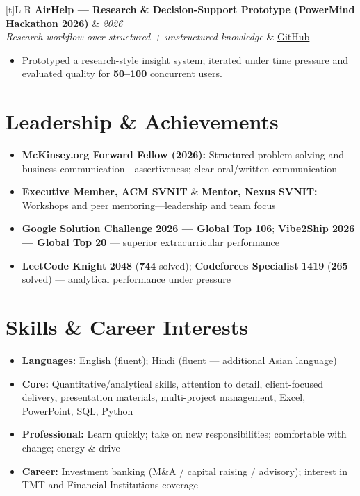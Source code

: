 \documentclass[a4paper,10pt]{article}
\newcommand{\resumeProject}[4]{%
  \vspace{0.25mm}
  \noindent
  \begin{tabularx}{\textwidth}[t]{L R}
    \textbf{#1} & \textit{#3} \\
    \textit{#2} & #4 \\
  \end{tabularx}
  \vspace{-0.25mm}%
}
\begin{document}
\resumeProject
  {AirHelp --- Research \& Decision-Support Prototype (PowerMind Hackathon 2026)}
  {Research workflow over structured + unstructured knowledge}
  {2026}
  {\href{https://github.com/Ojas-Srivastava05/AirHelp-AI-Airport-Assistant}{GitHub}}
\begin{itemize}
  \item Prototyped a research-style insight system; iterated under time pressure and evaluated quality for \textbf{50--100} concurrent users.
\end{itemize}

\section{Leadership \& Achievements}
\small
\begin{itemize}
  \item \textbf{McKinsey.org Forward Fellow (2026):} Structured problem-solving and business communication---assertiveness; clear oral/written communication
  \item \textbf{Executive Member, ACM SVNIT} \& \textbf{Mentor, Nexus SVNIT:} Workshops and peer mentoring---leadership and team focus
  \item \textbf{Google Solution Challenge 2026 --- Global Top 106}; \textbf{Vibe2Ship 2026 --- Global Top 20} --- superior extracurricular performance
  \item \textbf{LeetCode Knight} \textbf{2048} (\textbf{744} solved); \textbf{Codeforces Specialist} \textbf{1419} (\textbf{265} solved) --- analytical performance under pressure
\end{itemize}

\section{Skills \& Career Interests}
\small
\begin{itemize}[label={}]
  \item \textbf{Languages:} English (fluent); Hindi (fluent --- additional Asian language)
  \item \textbf{Core:} Quantitative/analytical skills, attention to detail, client-focused delivery, presentation materials, multi-project management, Excel, PowerPoint, SQL, Python
  \item \textbf{Professional:} Learn quickly; take on new responsibilities; comfortable with change; energy \& drive
  \item \textbf{Career:} Investment banking (M\&A / capital raising / advisory); interest in TMT and Financial Institutions coverage
\end{itemize}
\end{document}
